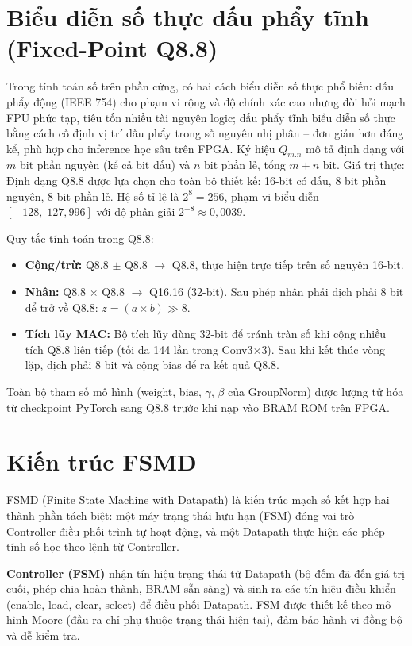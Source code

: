 \documentclass{uetgraduation}
\begin{document}
\section{Biểu diễn số thực dấu phẩy tĩnh (Fixed-Point Q8.8)}
Trong tính toán số trên phần cứng, có hai cách biểu diễn số thực phổ biến:
dấu phẩy động (IEEE 754) cho phạm vi rộng và độ chính xác cao nhưng đòi hỏi mạch
FPU phức tạp, tiêu tốn nhiều tài nguyên logic; dấu phẩy tĩnh biểu diễn số thực bằng
cách cố định vị trí dấu phẩy trong số nguyên nhị phân -- đơn giản hơn đáng kể,
phù hợp cho inference học sâu trên FPGA. Ký hiệu $Q_{m.n}$ mô tả định dạng với
$m$ bit phần nguyên (kể cả bit dấu) và $n$ bit phần lẻ, tổng $m+n$ bit. Giá trị
thực:
Định dạng Q8.8 được lựa chọn cho toàn bộ thiết kế: 16-bit có dấu, 8 bit phần
nguyên, 8 bit phần lẻ. Hệ số tỉ lệ là $2^8 = 256$, phạm vi biểu diễn
$[-128,\; 127{,}996]$ với độ phân giải $2^{-8} \approx 0{,}0039$.

Quy tắc tính toán trong Q8.8:
\begin{itemize}
    \item \textbf{Cộng/trừ:} Q8.8 $\pm$ Q8.8 $\to$ Q8.8, thực hiện trực tiếp trên
    số nguyên 16-bit.
    \item \textbf{Nhân:} Q8.8 $\times$ Q8.8 $\to$ Q16.16 (32-bit). Sau phép nhân
    phải dịch phải 8 bit để trở về Q8.8: $z = (a \times b) \gg 8$.
    \item \textbf{Tích lũy MAC:} Bộ tích lũy dùng 32-bit để tránh tràn số khi cộng
    nhiều tích Q8.8 liên tiếp (tối đa 144 lần trong Conv3$\times$3). Sau khi kết
    thúc vòng lặp, dịch phải 8 bit và cộng bias để ra kết quả Q8.8.
\end{itemize}

Toàn bộ tham số mô hình (weight, bias, $\gamma$, $\beta$ của GroupNorm) được lượng
tử hóa từ checkpoint PyTorch sang Q8.8 trước khi nạp vào BRAM ROM trên FPGA.

\section{Kiến trúc FSMD}
FSMD (Finite State Machine with Datapath) là kiến trúc mạch số kết hợp
hai thành phần tách biệt: một máy trạng thái hữu hạn (FSM) đóng vai trò Controller
điều phối trình tự hoạt động, và một Datapath thực hiện các phép tính số học theo
lệnh từ Controller.

\textbf{Controller (FSM)} nhận tín hiệu trạng thái từ Datapath (bộ đếm đã đến giá
trị cuối, phép chia hoàn thành, BRAM sẵn sàng) và sinh ra các tín hiệu điều khiển
(enable, load, clear, select) để điều phối Datapath. FSM được thiết kế theo mô hình
Moore (đầu ra chỉ phụ thuộc trạng thái hiện tại), đảm bảo hành vi đồng bộ và dễ
kiểm tra.
\end{document}
